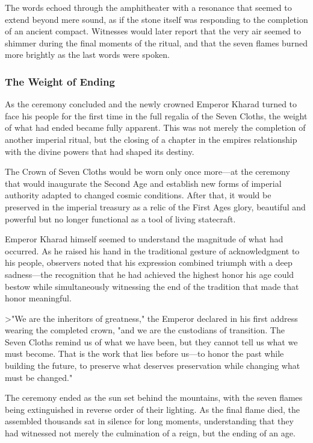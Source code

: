 The words echoed through the amphitheater with a resonance that seemed
to extend beyond mere sound, as if the stone itself was responding to
the completion of an ancient compact. Witnesses would later report that
the very air seemed to shimmer during the final moments of the ritual,
and that the seven flames burned more brightly as the last words were
spoken.

\subsubsection{The Weight of Ending}\label{the-weight-of-ending}

As the ceremony concluded and the newly crowned Emperor Kharad turned to
face his people for the first time in the full regalia of the Seven
Cloths, the weight of what had ended became fully apparent. This was not
merely the completion of another imperial ritual, but the closing of a
chapter in the empire\textquotesingle s relationship with the divine
powers that had shaped its destiny.

The Crown of Seven Cloths would be worn only once more---at the ceremony
that would inaugurate the Second Age and establish new forms of imperial
authority adapted to changed cosmic conditions. After that, it would be
preserved in the imperial treasury as a relic of the First
Age\textquotesingle s glory, beautiful and powerful but no longer
functional as a tool of living statecraft.

Emperor Kharad himself seemed to understand the magnitude of what had
occurred. As he raised his hand in the traditional gesture of
acknowledgment to his people, observers noted that his expression
combined triumph with a deep sadness---the recognition that he had
achieved the highest honor his age could bestow while simultaneously
witnessing the end of the tradition that made that honor meaningful.

\textgreater"We are the inheritors of greatness," the Emperor declared
in his first address wearing the completed crown, "and we are the
custodians of transition. The Seven Cloths remind us of what we have
been, but they cannot tell us what we must become. That is the work that
lies before us---to honor the past while building the future, to
preserve what deserves preservation while changing what must be
changed."

The ceremony ended as the sun set behind the mountains, with the seven
flames being extinguished in reverse order of their lighting. As the
final flame died, the assembled thousands sat in silence for long
moments, understanding that they had witnessed not merely the
culmination of a reign, but the ending of an age.

